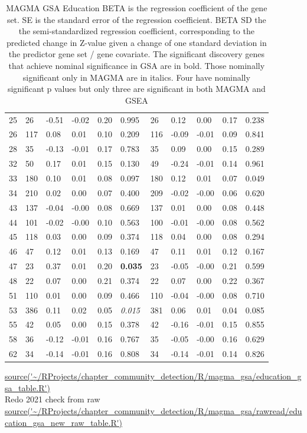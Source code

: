 \begin{table}[ht]
\begin{tabular}{cllllllllll}
  25 & 26 & -0.51 & -0.02 & 0.20 & 0.995 & 26 & 0.12 & 0.00 & 0.17 & 0.238 \\ 
  26 & 117 & 0.08 & 0.01 & 0.10 & 0.209 & 116 & -0.09 & -0.01 & 0.09 & 0.841 \\ 
  28 & 35 & -0.13 & -0.01 & 0.17 & 0.783 & 35 & 0.09 & 0.00 & 0.15 & 0.289 \\ 
  32 & 50 & 0.17 & 0.01 & 0.15 & 0.130 & 49 & -0.24 & -0.01 & 0.14 & 0.961 \\ 
  33 & 180 & 0.10 & 0.01 & 0.08 & 0.097 & 180 & 0.12 & 0.01 & 0.07 & 0.049 \\ 
  34 & 210 & 0.02 & 0.00 & 0.07 & 0.400 & 209 & -0.02 & -0.00 & 0.06 & 0.620 \\ 
  43 & 137 & -0.04 & -0.00 & 0.08 & 0.669 & 137 & 0.01 & 0.00 & 0.08 & 0.448 \\ 
  44 & 101 & -0.02 & -0.00 & 0.10 & 0.563 & 100 & -0.01 & -0.00 & 0.08 & 0.562 \\ 
  45 & 118 & 0.03 & 0.00 & 0.09 & 0.374 & 118 & 0.04 & 0.00 & 0.08 & 0.294 \\ 
  46 & 47 & 0.12 & 0.01 & 0.13 & 0.169 & 47 & 0.11 & 0.01 & 0.12 & 0.167 \\ 
  47 & 23 & 0.37 & 0.01 & 0.20 & \textbf{0.035} & 23 & -0.05 & -0.00 & 0.21 & 0.599 \\ 
  48 & 22 & 0.07 & 0.00 & 0.21 & 0.374 & 22 & 0.07 & 0.00 & 0.22 & 0.367 \\ 
  51 & 110 & 0.01 & 0.00 & 0.09 & 0.466 & 110 & -0.04 & -0.00 & 0.08 & 0.710 \\ 
  53 & 386 & 0.11 & 0.02 & 0.05 & \textit{0.015} & 381 & 0.06 & 0.01 & 0.04 & 0.085 \\ 
  55 & 42 & 0.05 & 0.00 & 0.15 & 0.378 & 42 & -0.16 & -0.01 & 0.15 & 0.855 \\ 
  58 & 36 & -0.12 & -0.01 & 0.16 & 0.767 & 35 & -0.05 & -0.00 & 0.16 & 0.629 \\ 
  62 & 34 & -0.14 & -0.01 & 0.16 & 0.808 & 34 & -0.14 & -0.01 & 0.14 & 0.826 \\ 
   \bottomrule
\end{tabular}
\caption{MAGMA GSA Education  BETA is the regression coefficient of the gene set. SE is the standard error of the regression coefficient. BETA SD the the semi-standardized regression coefficient, corresponding to the predicted
change in Z-value given a change of one standard deviation in the predictor gene set / gene covariate. The significant discovery genes that achieve nominal significance in GSA are in bold. Those nominally significant only in MAGMA are in italics. Four have nominally significant p values but only three are significant in both MAGMA and GSEA } 
\tiny\url{source('~/RProjects/chapter_community_detection/R/magma_gsa/education_gsa_table.R')}
\tiny \\ Redo 2021 check from raw \url{source('~/RProjects/chapter_community_detection/R/magma_gsa/rawread/education_gsa_new_raw_table.R')}
\label{tab:MAGMA GSA Education  BE}
\end{table}
